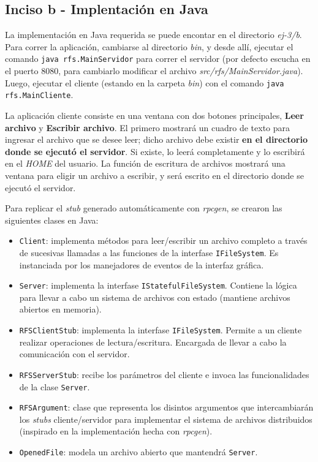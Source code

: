 \subsection{Inciso b - Implentación en Java}

La implementación en Java requerida se puede encontar en el directorio \emph{ej-3/b}. Para correr la aplicación, cambiarse al directorio \emph{bin}, y desde allí, ejecutar el comando \texttt{java rfs.MainServidor} para correr el servidor (por defecto escucha en el puerto 8080, para cambiarlo modificar el archivo \emph{src/rfs/MainServidor.java}). Luego, ejecutar el cliente (estando en la carpeta \emph{bin}) con el comando \texttt{java rfs.MainCliente}.

La aplicación cliente consiste en una ventana con dos botones principales, \textbf{Leer archivo} y \textbf{Escribir archivo}. El primero mostrará un cuadro de texto para ingresar el archivo que se desee leer; dicho archivo debe existir \textbf{en el directorio donde se ejecutó el servidor}. Si existe, lo leerá completamente y lo escribirá en el \emph{HOME} del usuario. La función de escritura de archivos mostrará una ventana para eligir un archivo a escribir, y será escrito en el directorio donde se ejecutó el servidor. 

Para replicar el \emph{stub} generado automáticamente con \emph{rpcgen}, se crearon las siguientes clases en Java:
\begin{itemize}
    \item \texttt{Client}: implementa métodos para leer/escribir un archivo completo a través de sucesivas llamadas a las funciones de la interfase \texttt{IFileSystem}. Es instanciada por los manejadores de eventos de la interfaz gráfica.
    \item \texttt{Server}: implementa la interfase \texttt{IStatefulFileSystem}. Contiene la lógica para llevar a cabo un sistema de archivos con estado (mantiene archivos abiertos en memoria).
    \item \texttt{RFSClientStub}: implementa la interfase \texttt{IFileSystem}. Permite a un cliente realizar operaciones de lectura/escritura. Encargada de llevar a cabo la comunicación con el servidor.
    \item \texttt{RFSServerStub}: recibe los parámetros del cliente e invoca las funcionalidades de la clase \texttt{Server}.
    \item \texttt{RFSArgument}: clase que representa los disintos argumentos que intercambiarán los \emph{stubs} cliente/servidor para implementar el sistema de archivos distribuidos (inspirado en la implementación hecha con \emph{rpcgen}).  
    \item \texttt{OpenedFile}: modela un archivo abierto que mantendrá \texttt{Server}.
\end{itemize}

